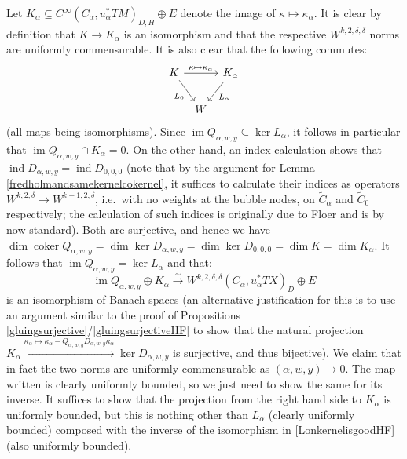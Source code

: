 \documentclass[12pt]{article}
\theoremstyle{definition}
\theoremstyle{remark}
\numberwithin{equation}{subsection}
\newcommand{\ind}{\operatorname{ind}}
\newcommand{\coker}{\operatorname{coker}}
\newcommand{\im}{\operatorname{im}}
\begin{document}
Let $K_\alpha\subseteq C^\infty(C_\alpha,u_\alpha^\ast TM)_{D,H}\oplus E$ denote the image of $\kappa\mapsto\kappa_\alpha$.  It is clear by definition that $K\to K_\alpha$ is an isomorphism and that the respective $W^{k,2,\delta,\delta}$ norms are uniformly commensurable.  It is also clear that the following commutes:
\begin{equation}\label{LonkernelisgoodHF}
\begin{tikzcd}[column sep = tiny]
K\ar{dr}[swap]{L_0}\ar{rr}{\kappa\mapsto\kappa_\alpha}&&K_\alpha\ar{dl}{L_\alpha}\\
&W
\end{tikzcd}
\end{equation}
(all maps being isomorphisms).  Since $\im Q_{\alpha,w,y}\subseteq\ker L_\alpha$, it follows in particular that $\im Q_{\alpha,w,y}\cap K_\alpha=0$.  On the other hand, an index calculation shows that $\ind D_{\alpha,w,y}=\ind D_{0,0,0}$ (note that by the argument for Lemma \ref{fredholmandsamekernelcokernel}, it suffices to calculate their indices as operators $W^{k,2,\delta}\to W^{k-1,2,\delta}$, i.e.\ with no weights at the bubble nodes, on $\tilde C_\alpha$ and $\tilde C_0$ respectively; the calculation of such indices is originally due to Floer \cite{floersfhs,floerindex} and is by now standard).  Both are surjective, and hence we have $\dim\coker Q_{\alpha,w,y}=\dim\ker D_{\alpha,w,y}=\dim\ker D_{0,0,0}=\dim K=\dim K_\alpha$.  It follows that $\im Q_{\alpha,w,y}=\ker L_\alpha$ and that:
\begin{equation}
\im Q_{\alpha,w,y}\oplus K_\alpha\xrightarrow\sim W^{k,2,\delta,\delta}(C_\alpha,u_\alpha^\ast TX)_D\oplus E
\end{equation}
is an isomorphism of Banach spaces (an alternative justification for this is to use an argument similar to the proof of Propositions \ref{gluingsurjective}/\ref{gluingsurjectiveHF} to show that the natural projection $K_\alpha\xrightarrow{\kappa_\alpha\mapsto\kappa_\alpha-Q_{\alpha,w,y}D_{\alpha,w,y}\kappa_\alpha}\ker D_{\alpha,w,y}$ is surjective, and thus bijective).  We claim that in fact the two norms are uniformly commensurable as $(\alpha,w,y)\to 0$.  The map written is clearly uniformly bounded, so we just need to show the same for its inverse.  It suffices to show that the projection from the right hand side to $K_\alpha$ is uniformly bounded, but this is nothing other than $L_\alpha$ (clearly uniformly bounded) composed with the inverse of the isomorphism in \eqref{LonkernelisgoodHF} (also uniformly bounded).
\end{document}
